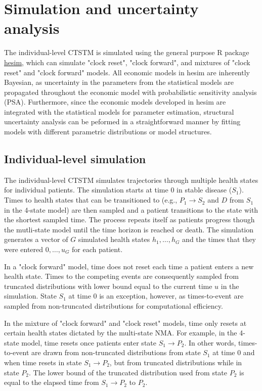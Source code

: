 \documentclass[11pt,final,fleqn]{article}\usepackage[]{graphicx}\usepackage[]{color}
\theoremstyle{plain}
\newcommand\R{{\textsf{R}}}
\newcommand{\pkg}[1]{{\fontseries{b}\selectfont #1}}
\begin{document}
\section{Simulation and uncertainty analysis}\label{sec:uncertainty-analysis}
The individual-level CTSTM is simulated using the general purpose \R{} package \href{https://innovationvalueinitiative.github.io/hesim/}{\pkg{hesim}}, which can simulate "clock reset", "clock forward", and mixtures of "clock reset" and "clock forward" models. All economic models in \pkg{hesim} are inherently Bayesian, as uncertainty in the parameters from the statistical models are propagated throughout the economic model with probabilistic sensitivity analysis (PSA).   Furthermore, since the economic models developed in \pkg{hesim} are integrated with the statistical models for parameter estimation, structural uncertainty analysis can be peformed in a straightforward manner by fitting models with different parametric distributions or model structures. 

\subsection{Individual-level simulation}\label{subsec:indivsim}
The individual-level CTSTM simulates trajectories through multiple health states for individual patients. The simulation starts at time $0$ in stable disease ($S_1$). Times to health states that can be transitioned to (e.g., $P_1 \rightarrow S_2$ and $D$ from $S_1$ in the 4-state model) are then sampled and a patient transitions to the state with the shortest sampled time. The process repeats itself as patients progress though the mutli-state model until the time horizon is reached or death. The simulation generates a vector of $G$ simulated health states $h_1,\ldots,h_G$ and the times that they were entered $0, \ldots, u_G$ for each patient.  

In a "clock forward" model, time does not reset each time a patient enters a new health state. Times to the competing events are consequently sampled from truncated distributions with lower bound equal to the current time $u$ in the simulation. State $S_1$ at time $0$ is an exception, however, as times-to-event are sampled from non-truncated distributions for computational efficiency. 

In the mixture of "clock forward" and "clock reset" models, time only resets at certain health states dictated by the multi-state NMA. For example, in the 4-state model, time resets once patients enter state $S_1 \rightarrow P_2$. In other words, times-to-event are drawn from non-truncated distributions from state $S_1$ at time $0$ and when time resets in state $S_1 \rightarrow P_2$, but from truncated distributions while in state $P_2$. The lower bound of the truncated distribution used from state $P_2$ is equal to the elapsed time from $S_1 \rightarrow P_2$ to $P_2$.  
\end{document}
